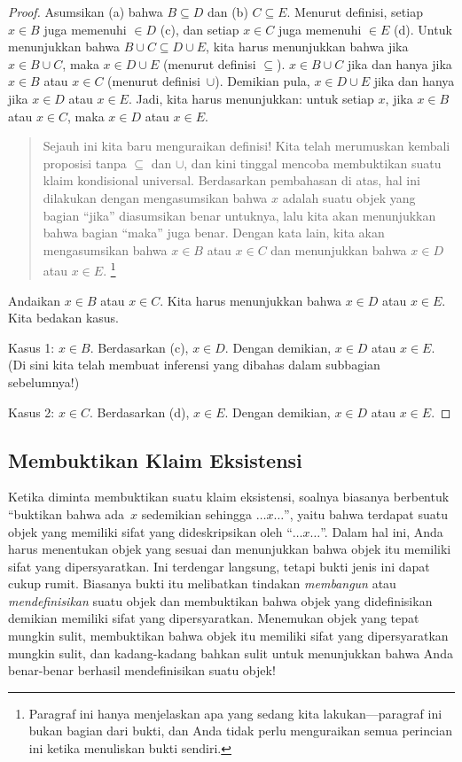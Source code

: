 \documentclass[../../../include/open-logic-section]{subfiles}
\begin{document}
\begin{proof}
  Asumsikan (a) bahwa $B \subseteq D$ dan (b) $C \subseteq E$. Menurut
  definisi, setiap $x \in B$ juga memenuhi $\in D$ (c), dan setiap
  $x \in C$ juga memenuhi $\in E$ (d). Untuk menunjukkan bahwa $B
  \cup C \subseteq D \cup E$, kita harus menunjukkan bahwa jika $x \in
  B \cup C$, maka $x \in D \cup E$ (menurut definisi $\subseteq$). $x
  \in B \cup C$ jika dan hanya jika $x \in B$ atau $x \in C$ (menurut
  definisi~$\cup$). Demikian pula, $x \in D \cup E$ jika dan hanya jika
  $x \in D$ atau $x \in E$. Jadi, kita harus menunjukkan: untuk setiap
  $x$, jika $x \in B$ atau $x \in C$, maka $x \in D$ atau $x \in E$.

  \begin{quote}
  Sejauh ini kita baru menguraikan definisi!{} Kita telah merumuskan
  kembali proposisi tanpa $\subseteq$ dan $\cup$, dan kini tinggal
  mencoba membuktikan suatu klaim kondisional universal. Berdasarkan
  pembahasan di atas, hal ini dilakukan dengan mengasumsikan bahwa $x$
  adalah suatu objek yang bagian ``jika'' diasumsikan benar untuknya,
  lalu kita akan menunjukkan bahwa bagian ``maka'' juga benar. Dengan
  kata lain, kita akan mengasumsikan bahwa $x \in B$ atau $x \in C$
  dan menunjukkan bahwa $x \in D$ atau $x \in E$.
  \footnote{Paragraf ini hanya menjelaskan apa yang sedang kita
    lakukan---paragraf ini bukan bagian dari bukti, dan Anda tidak
    perlu menguraikan semua perincian ini ketika menuliskan bukti
    sendiri.}
  \end{quote}

  Andaikan $x \in B$ atau $x \in C$. Kita harus menunjukkan bahwa $x
  \in D$ atau $x \in E$. Kita bedakan kasus.

  Kasus 1: $x \in B$. Berdasarkan (c), $x \in D$. Dengan demikian, $x
  \in D$ atau $x \in E$. (Di sini kita telah membuat inferensi yang
  dibahas dalam subbagian sebelumnya!)

  Kasus 2: $x \in C$. Berdasarkan (d), $x \in E$. Dengan demikian, $x
  \in D$ atau $x \in E$.
 \end{proof}


\subsection{Membuktikan Klaim Eksistensi}

Ketika diminta membuktikan suatu klaim eksistensi, soalnya biasanya
berbentuk ``buktikan bahwa ada~$x$ sedemikian sehingga $\dots x
\dots$'', yaitu bahwa terdapat suatu objek yang memiliki sifat yang
dideskripsikan oleh ``$\dots x \dots$''. Dalam hal ini, Anda harus
menentukan objek yang sesuai dan menunjukkan bahwa objek itu memiliki
sifat yang dipersyaratkan. Ini terdengar langsung, tetapi bukti jenis
ini dapat cukup rumit. Biasanya bukti itu melibatkan tindakan
\emph{membangun} atau \emph{mendefinisikan} suatu objek dan membuktikan
bahwa objek yang didefinisikan demikian memiliki sifat yang
dipersyaratkan. Menemukan objek yang tepat mungkin sulit, membuktikan
bahwa objek itu memiliki sifat yang dipersyaratkan mungkin sulit, dan
kadang-kadang bahkan sulit untuk menunjukkan bahwa Anda benar-benar
berhasil mendefinisikan suatu objek!{}
\end{document}
